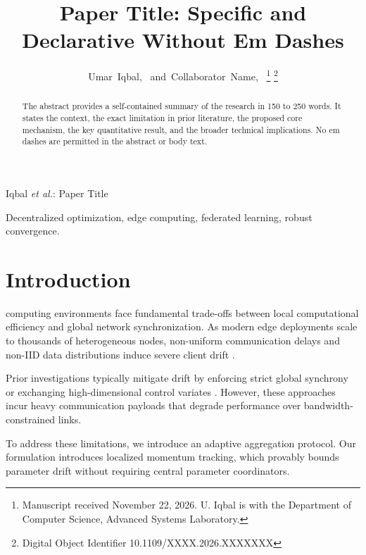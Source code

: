 \documentclass[journal]{IEEEtran}
\begin{document}
\title{Paper Title: Specific and Declarative Without Em Dashes}

\author{Umar~Iqbal,~
        and~Collaborator~Name,~%
\thanks{Manuscript received November 22, 2026. U. Iqbal is with the Department of Computer Science, Advanced Systems Laboratory.}%
\thanks{Digital Object Identifier 10.1109/XXXX.2026.XXXXXXX}}

%
{Iqbal \MakeLowercase{\textit{et al.}}: Paper Title}

\maketitle

\begin{abstract}
The abstract provides a self-contained summary of the research in 150 to 250 words. It states the context, the exact limitation in prior literature, the proposed core mechanism, the key quantitative result, and the broader technical implications. No em dashes are permitted in the abstract or body text.
\end{abstract}

\begin{IEEEkeywords}
Decentralized optimization, edge computing, federated learning, robust convergence.
\end{IEEEkeywords}

\section{Introduction}
 computing environments face fundamental trade-offs between local computational efficiency and global network synchronization. As modern edge deployments scale to thousands of heterogeneous nodes, non-uniform communication delays and non-IID data distributions induce severe client drift \cite{mcmahan2017communication}.

Prior investigations typically mitigate drift by enforcing strict global synchrony \cite{li2020federated} or exchanging high-dimensional control variates \cite{karimireddy2020scaffold}. However, these approaches incur heavy communication payloads that degrade performance over bandwidth-constrained links.

To address these limitations, we introduce an adaptive aggregation protocol. Our formulation introduces localized momentum tracking, which provably bounds parameter drift without requiring central parameter coordinators.
\end{document}
